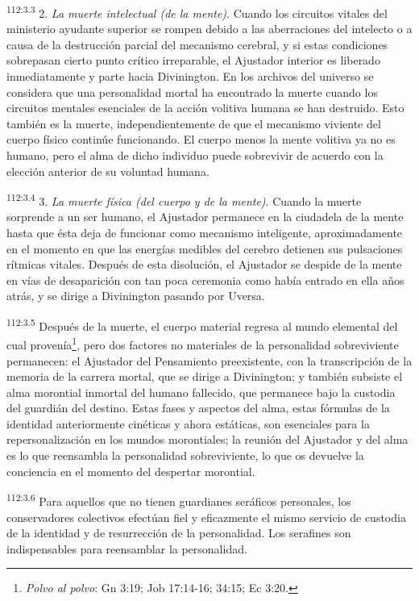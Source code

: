 \documentclass[twoside, 11pt]{book}
\begin{document}
\par
\textsuperscript{112:3.3} 2. \textit{La muerte intelectual (de la mente)}. Cuando los circuitos vitales del ministerio ayudante superior se rompen debido a las aberraciones del intelecto o a causa de la destrucción parcial del mecanismo cerebral, y si estas condiciones sobrepasan cierto punto crítico irreparable, el Ajustador interior es liberado inmediatamente y parte hacia Divinington. En los archivos del universo se considera que una personalidad mortal ha encontrado la muerte cuando los circuitos mentales esenciales de la acción volitiva humana se han destruido. Esto también es la muerte, independientemente de que el mecanismo viviente del cuerpo físico continúe funcionando. El cuerpo menos la mente volitiva ya no es humano, pero el alma de dicho individuo puede sobrevivir de acuerdo con la elección anterior de su voluntad humana.

\par
\textsuperscript{112:3.4} 3. \textit{La muerte física (del cuerpo y de la mente)}. Cuando la muerte sorprende a un ser humano, el Ajustador permanece en la ciudadela de la mente hasta que ésta deja de funcionar como mecanismo inteligente, aproximadamente en el momento en que las energías medibles del cerebro detienen sus pulsaciones rítmicas vitales. Después de esta disolución, el Ajustador se despide de la mente en vías de desaparición con tan poca ceremonia como había entrado en ella años atrás, y se dirige a Divinington pasando por Uversa.

\par
\textsuperscript{112:3.5} Después de la muerte, el cuerpo material regresa al mundo elemental del cual provenía\footnote{\textit{Polvo al polvo}: Gn 3:19; Job 17:14-16; 34:15; Ec 3:20.}, pero dos factores no materiales de la personalidad sobreviviente permanecen: el Ajustador del Pensamiento preexistente, con la transcripción de la memoria de la carrera mortal, que se dirige a Divinington; y también subsiste el alma morontial inmortal del humano fallecido, que permanece bajo la custodia del guardián del destino. Estas fases y aspectos del alma, estas fórmulas de la identidad anteriormente cinéticas y ahora estáticas, son esenciales para la repersonalización en los mundos morontiales; la reunión del Ajustador y del alma es lo que reensambla la personalidad sobreviviente, lo que os devuelve la conciencia en el momento del despertar morontial.

\par
\textsuperscript{112:3.6} Para aquellos que no tienen guardianes seráficos personales, los conservadores colectivos efectúan fiel y eficazmente el mismo servicio de custodia de la identidad y de resurrección de la personalidad. Los serafines son indispensables para reensamblar la personalidad.
\end{document}
